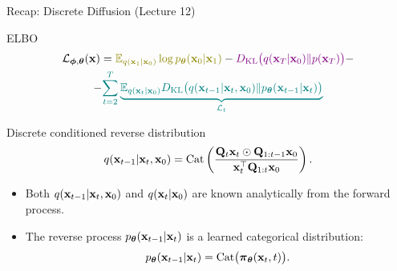 \documentclass{beamer}
\begin{document}
\begin{frame}
\titlepage
	\resetonslide
\end{frame}
\begin{frame}{Recap: Discrete Diffusion (Lecture 12)}
	\begin{block}{ELBO}
		\vspace{-0.7cm}
		\begin{multline*}
            \cL_{\bphi, \btheta}(\bx) =  {\color{olive}\bbE_{q(\bx_1 | \bx_0)} \log \pt(\bx_0 | \bx_1)} - {\color{violet}\KL\bigl(q(\bx_T | \bx_0) \| p(\bx_T)\bigr)} - \\
            - {\color{teal}\sum_{t=2}^T \underbrace{ \bbE_{q(\bx_t | \bx_0)} \KL \bigl(q(\bx_{t-1} | \bx_t, \bx_0) \| \pt(\bx_{t-1} | \bx_t)\bigr)}_{\cL_t}}
        \end{multline*}
		\vspace{-0.7cm}
	\end{block}
	\begin{block}{Discrete conditioned reverse distribution}
		\[
			q(\mathbf{x}_{t-1} | \mathbf{x}_t, \mathbf{x}_0)
			= \operatorname{Cat}\left(\frac{\mathbf{Q}_t \mathbf{x}_t \odot \mathbf{Q}_{1:t-1} \mathbf{x}_0}{\mathbf{x}_t^{\top}\mathbf{Q}_{1:t}\mathbf{x}_0}\right).
		\]
		\vspace{-0.3cm}
	\end{block}
	\begin{itemize}
		\item Both $q(\mathbf{x}_{t-1} | \mathbf{x}_t, \mathbf{x}_0)$ and $q(\mathbf{x}_t | \mathbf{x}_0)$ are known analytically from the forward process.
		\item The reverse process $p_{\boldsymbol{\theta}}(\mathbf{x}_{t-1} | \mathbf{x}_t)$ is a learned categorical distribution:
		\vspace{-0.3cm}
        \[
			p_{\boldsymbol{\theta}}(\mathbf{x}_{t-1} | \mathbf{x}_t) = \operatorname{Cat}\bigl( \boldsymbol{\pi}_{\boldsymbol{\theta}}(\mathbf{x}_t, t) \bigr).
		\]
	\end{itemize}
\end{frame}
\end{document}
